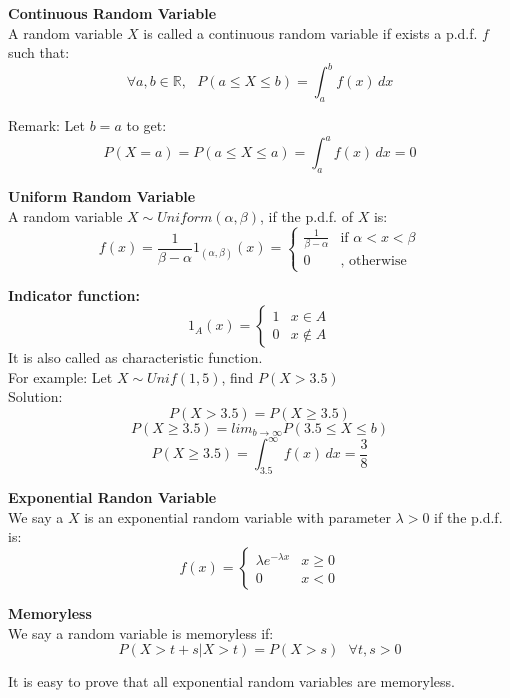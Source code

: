 \documentclass{article}
\begin{document}
\begin{definition}
    \textbf{Continuous Random Variable}\\
    A random variable $X$ is called a continuous random variable if exists a p.d.f. $f$ such that:
    $$\forall a,b \in \mathbb{R}, \text{ } P(a \leq X \leq b) = \int^b_a f(x) \, dx$$

\end{definition}
Remark: Let $b=a$ to get:
$$ P(X=a) = P(a\leq X\leq a) = \int^a_a f(x) \, dx = 0$$

\begin{definition}
    \textbf{Uniform Random Variable}\\
    A random variable $X \sim Uniform(\alpha,\beta)$, if the p.d.f. of $X$ is:
    \[
    f(x) = \frac{1}{\beta - \alpha} 1_{(\alpha, \beta)}(x) = 
    \begin{cases} 
    \frac{1}{\beta - \alpha} & \text{if } \alpha < x <\beta\\
    0 & \text{, otherwise}  
    \end{cases}
    \]
\end{definition}
\textbf{Indicator function:} 
\[
 1_A(x) =
 \begin{cases}
  1   &  x \in A \\
  0   &  x \notin A
 \end{cases}
\]
It is also called as characteristic function.\\
For example: Let $X \sim Unif(1,5)$, find $P(X > 3.5)$\\
Solution:
$$ P(X>3.5) = P(X \geq 3.5)$$
$$ P(X \geq 3.5) = lim_{b \rightarrow \infty}P(3.5 \leq X \leq b)$$
$$ P(X \geq 3.5) = \int^{\infty}_{3.5} f(x)\, dx = \frac{3}{8}$$

\begin{definition}
    \textbf{Exponential Randon Variable}\\
    We say a $X$ is an exponential random variable with parameter $\lambda > 0$ if the p.d.f. is:
    \[
    f(x) = 
    \begin{cases}
        \lambda e^{-\lambda x} & x \geq 0 \\
        0 & x < 0
    \end{cases}
    \]
\end{definition}

\begin{definition}
    \textbf{Memoryless}\\
    We say a random variable is memoryless if:
    $$ P(X > t+s | X>t) = P(X > s ) \text{ } \forall t,s>0$$
\end{definition}
It is easy to prove that all exponential random variables are memoryless.
\end{document}
